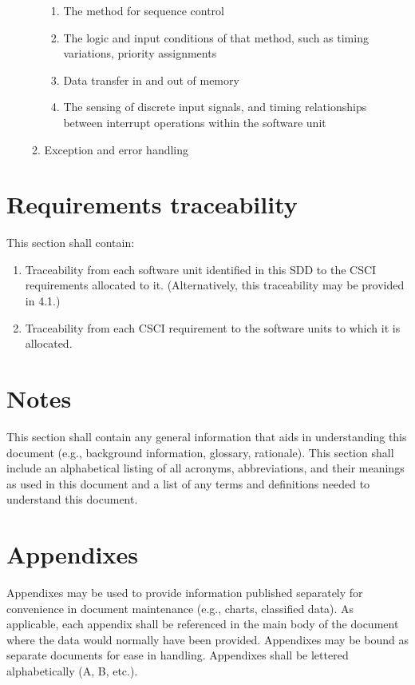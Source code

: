 \begin{enumerate}
\begin{enumerate}
    \begin{enumerate}
    \itemsep1pt\parskip0pt
    \item
      The method for sequence control
    \item
      The logic and input conditions of that method, such as timing
      variations, priority assignments
    \item
      Data transfer in and out of memory
    \item
      The sensing of discrete input signals, and timing relationships
      between interrupt operations within the software unit
    \end{enumerate}
  \item
    Exception and error handling
  \end{enumerate}
\end{enumerate}

\section{Requirements traceability}

This section shall contain:

\begin{enumerate}
\itemsep1pt\parskip0pt
\item
  Traceability from each software unit identified in this SDD to the
  CSCI requirements allocated to it. (Alternatively, this traceability
  may be provided in 4.1.)
\item
  Traceability from each CSCI requirement to the software units to which
  it is allocated.
\end{enumerate}

\section{Notes}

This section shall contain any general information that aids in
understanding this document (e.g., background information, glossary,
rationale). This section shall include an alphabetical listing of all
acronyms, abbreviations, and their meanings as used in this document and
a list of any terms and definitions needed to understand this document.

\appendix

\section{Appendixes}

Appendixes may be used to provide information published separately for
convenience in document maintenance (e.g., charts, classified data). As
applicable, each appendix shall be referenced in the main body of the
document where the data would normally have been provided. Appendixes
may be bound as separate documents for ease in handling. Appendixes
shall be lettered alphabetically (A, B, etc.).
